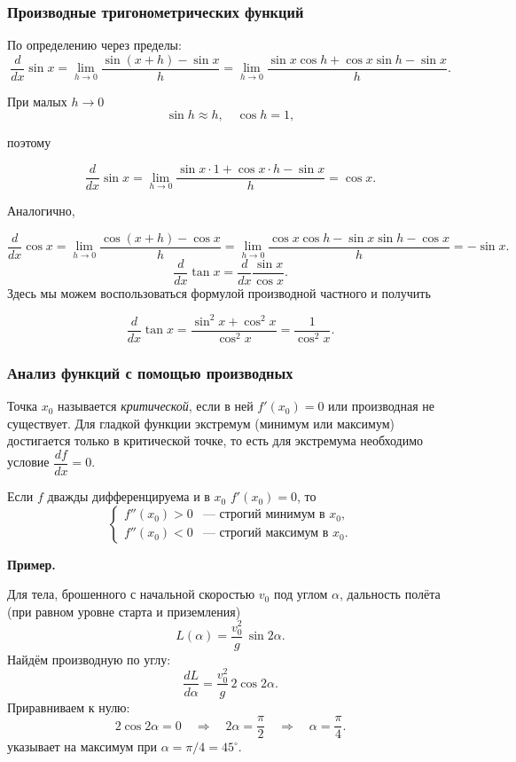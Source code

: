 \documentclass[12pt, a4paper]{article}%
\begin{document}
\subsubsection*{Производные тригонометрических функций}
По определению через пределы:
\[
\frac{d}{dx}\sin x
=\lim_{h\to0}\frac{\sin(x+h)-\sin x}{h}
=\lim_{h\to0}\frac{\sin x\cos h+\cos x\sin h-\sin x}{h}.
\]

При малых $h \to 0$
\[
\sin h \approx h, \quad \cos h = 1, 
\]

поэтому 

\[
\frac{d}{dx}\sin x
= \lim_{h\to0}\frac{\sin x\cdot 1+\cos x\cdot h -\sin x}{h} = \cos x.
\]

Аналогично, 

\[
\frac{d}{dx}\cos x
=\lim_{h\to0}\frac{\cos(x+h)-\cos x}{h}
=\lim_{h\to0}\frac{\cos x\cos h-\sin x\sin h-\cos x}{h}
=-\sin x.
\]
\[
\frac{d}{dx}\tan x = \frac{d}{dx}\frac{\sin x}{\cos x}.

\]
Здесь мы можем воспользоваться формулой производной частного и получить

\[
\frac{d}{dx}\tan x = \frac{\sin^2 x+\cos^2 x}{\cos^2 x} = \frac{1}{\cos^2 x}.
\]

\subsubsection*{Анализ функций с помощью производных}
Точка \(x_0\) называется \emph{критической}, если в ней \(f'(x_0)=0\) или производная не существует.  
Для гладкой функции экстремум (минимум или максимум) достигается только в критической точке, то есть для экстремума необходимо условие $\dfrac{df}{dx} = 0$.  


Если \(f\) дважды дифференцируема и в \(x_0\) \(f'(x_0)=0\), то
\[
\begin{cases}
f''(x_0)>0 & \text{— строгий минимум в }x_0,\\
f''(x_0)<0 & \text{— строгий максимум в }x_0.
\end{cases}
\]

\textbf{Пример.}

Для тела, брошенного с начальной скоростью $v_0$ под углом $\alpha$, дальность полёта (при равном уровне старта и приземления)  
\[
L(\alpha)=\frac{v_0^2}{g}\,\sin2\alpha.
\]
Найдём производную по углу:
\[
\frac{dL}{d\alpha}
=\frac{v_0^2}{g}\,2\cos2\alpha.
\]
Приравниваем к нулю:
\[
2\cos2\alpha=0\quad\Longrightarrow\quad2\alpha=\frac\pi2\quad\Longrightarrow\quad\alpha=\frac\pi4.
\]
указывает на максимум при $\alpha=\pi/4 = 45^\circ$.
\end{document}
